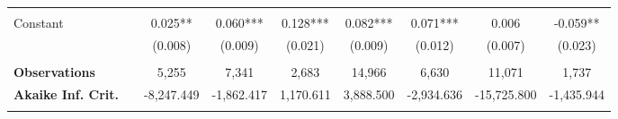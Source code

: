 \begin{tabular*}{\linewidth}{@{\extracolsep{\fill} } llccccccc}
\arrayrulecolor{white}%
\hline%
\arrayrulecolor{white}%
\hline%
\arrayrulecolor{white}%
\hline%
\arrayrulecolor{white}%
\hline%
\arrayrulecolor{white}%
\hline%
&&&&&&&&\\%
\multirow{2}{*}{Constant}&&0.025**&0.060***&0.128***&0.082***&0.071***&0.006&{-}0.059**\\%
&&(0.008)&(0.009)&(0.021)&(0.009)&(0.012)&(0.007)&(0.023)\\%
\arrayrulecolor{white}%
\hline%
\arrayrulecolor{white}%
\hline%
\arrayrulecolor{white}%
\hline%
\arrayrulecolor{white}%
\hline%
\arrayrulecolor{white}%
\hline%
&&&&&&&&\\%
\bfseries Observations&&5,255&7,341&2,683&14,966&6,630&11,071&1,737\\%
\bfseries Akaike Inf. Crit.&&{-}8,247.449&{-}1,862.417&1,170.611&3,888.500&{-}2,934.636&{-}15,725.800&{-}1,435.944\\%
\arrayrulecolor{white}%
\hline%
\arrayrulecolor{white}%
\hline%
\arrayrulecolor{white}%
\hline%
\arrayrulecolor{white}%
\hline%
\arrayrulecolor{white}%
\hline%
\arrayrulecolor{black}%
\hline%
\end{tabular*}